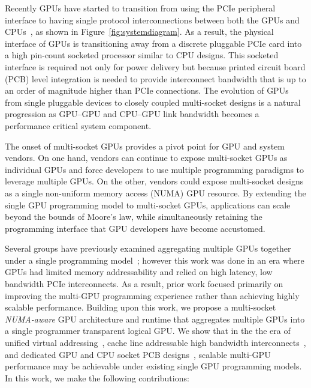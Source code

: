 Recently GPUs have started to transition from using the PCIe peripheral 
interface to having single protocol interconnections between both the GPUs and 
CPUs~\cite{dgx,SierraHPC,AMDINFINITYFABRIC}, as shown in 
Figure~\ref{fig:systemdiagram}. As a result, the physical interface of GPUs is 
transitioning away from a discrete pluggable PCIe card into a high pin-count 
socketed processor similar to CPU designs. This socketed interface is required 
not only for power delivery but because
printed circuit board (PCB) level integration is needed to provide
interconnect bandwidth that is up to an order of magnitude higher than PCIe
connections. The evolution of GPUs from single pluggable devices to closely
coupled multi-socket designs is a natural progression as GPU--GPU and CPU--GPU
link bandwidth becomes a performance critical system component.

The onset of multi-socket GPUs provides a pivot point for GPU and system 
vendors. On one hand, vendors can continue to expose multi-socket GPUs as 
individual GPUs and force developers to use multiple programming paradigms to 
leverage multiple GPUs. On the other, vendors could expose multi-socket 
designs as a single non-uniform memory access (NUMA) GPU resource.  By 
extending the single GPU programming model to multi-socket GPUs,  applications 
can scale beyond the bounds of Moore's law, while simultaneously retaining the 
programming interface that GPU developers have become accustomed.

Several groups have previously examined aggregating multiple GPUs together under 
a single programming model~\cite{lee2013transparent,Cabezas2015}; however this 
work was done in an era where GPUs had limited memory addressability and relied 
on high latency, low bandwidth PCIe interconnects. As a result, prior work 
focused primarily on improving the multi-GPU programming experience rather than 
achieving highly scalable performance. Building upon this work, we propose a 
multi-socket \textit{NUMA-aware} GPU architecture and runtime that aggregates 
multiple GPUs into a single programmer transparent logical GPU. We show that in 
the the era of unified virtual addressing~\cite{UVM}, cache line addressable 
high bandwidth interconnects~\cite{NVLINK}, and dedicated GPU and CPU socket PCB 
designs~\cite{SierraHPC}, scalable multi-GPU performance may be achievable under 
existing single GPU programming models. In this work, we make the following 
contributions:

